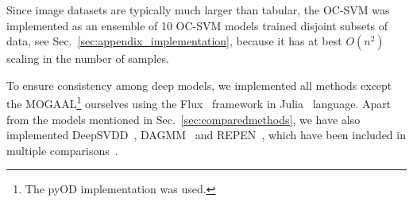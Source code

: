 Since image datasets are typically much larger than tabular, the OC-SVM was implemented as an ensemble of 10 OC-SVM models trained disjoint subsets of data, see Sec.~\ref{sec:appendix_implementation}, because it has at best $O(n^2)$ scaling in the number of samples. 

To ensure consistency among deep models, we implemented all methods except the MOGAAL\footnote{The pyOD implementation was used.} ourselves using the Flux~\cite{innes:2018} framework in Julia~\cite{Julia-2017} language. Apart from the models mentioned in Sec.~\ref{sec:comparedmethods}, we have also implemented DeepSVDD~\cite{ruff2018deep}, DAGMM~\cite{zong2018deep} and REPEN~\cite{pangLearningRepresentationsUltrahighdimensional2018}, which have been included in multiple comparisons~\cite{ruff2020unifying, wang2020advae, chalapathy2018anomaly}.

